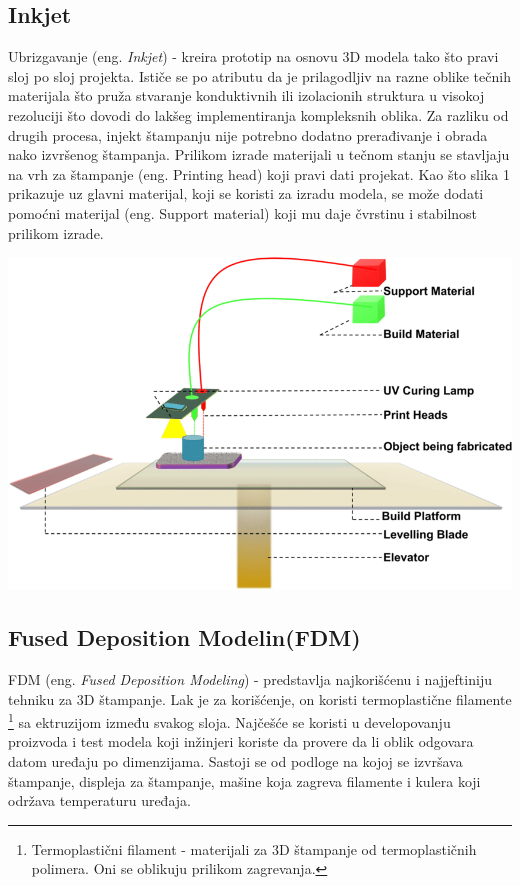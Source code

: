 \documentclass[a4paper]{article}
\begin{document}
\subsection{Inkjet}
\label{subsec:podnaslov1}
Ubrizgavanje (eng. \emph{Inkjet}) - kreira prototip na osnovu 3D modela tako što pravi sloj po sloj projekta.
\bigbreak Ističe se po atributu da je prilagodljiv na razne oblike tečnih materijala što pruža stvaranje konduktivnih ili izolacionih struktura u visokoj rezoluciji što dovodi do lakšeg implementiranja kompleksnih oblika. 
\bigbreak Za razliku od drugih procesa, injekt štampanju nije potrebno dodatno prerađivanje i obrada nako izvršenog štampanja.
\bigbreak Prilikom izrade materijali u tečnom stanju se stavljaju na vrh za štampanje (eng. Printing head) koji pravi dati projekat.
\bigbreak Kao što slika 1 prikazuje uz glavni materijal, koji se koristi za izradu modela,  se može dodati pomoćni materijal (eng. Support material) koji mu daje čvrstinu i stabilnost prilikom izrade.
\begin{center}
\includegraphics[width=.5\textwidth ]{Tehnikeslike/Inject.png}
\end{center}

\subsection{Fused Deposition Modelin(FDM)\cite{fdm}}
\label{subsec:podnaslov2}
FDM (eng. \emph{Fused Deposition Modeling}) - predstavlja najkorišćenu i najjeftiniju tehniku za 3D štampanje. Lak je za korišćenje, on koristi termoplastične filamente \footnote{Termoplastični filament - materijali za 3D štampanje od termoplastičnih polimera. Oni se oblikuju prilikom zagrevanja. } sa ektruzijom između svakog sloja.
\bigbreak Najčešće se koristi u developovanju proizvoda  i test modela koji inžinjeri koriste da provere da li oblik odgovara datom uređaju po dimenzijama. 
\bigbreak Sastoji se od podloge na kojoj se izvršava štampanje, displeja za štampanje, mašine koja zagreva filamente i kulera koji održava temperaturu uređaja.
\end{document}
